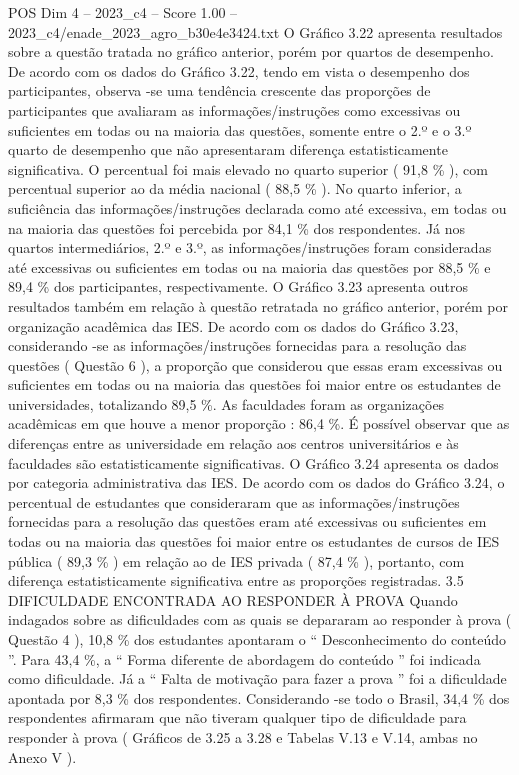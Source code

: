 \begin{textsample}{POS Dim 4 – 2023\_c4 – Score 1.00 – 2023\_c4/enade\_2023\_agro\_b30e4e3424.txt}
O Gráfico 3.22 apresenta resultados sobre a questão tratada no gráfico anterior, porém por quartos de desempenho.
De acordo com os dados do Gráfico 3.22, tendo em vista o desempenho dos participantes, observa -se uma tendência crescente das proporções de participantes que avaliaram as informações/instruções como excessivas ou suficientes em todas ou na maioria das questões, somente entre o 2.º e o 3.º quarto de desempenho que não apresentaram diferença estatisticamente significativa.
O percentual foi mais elevado no quarto superior ( 91,8 \% ), com percentual superior ao da média nacional ( 88,5 \% ).
No quarto inferior, a suficiência das informações/instruções declarada como até excessiva, em todas ou na maioria das questões foi percebida por 84,1 \% dos respondentes.
Já nos quartos intermediários, 2.º e 3.º, as informações/instruções foram consideradas até excessivas ou suficientes em todas ou na maioria das questões por 88,5 \% e 89,4 \% dos participantes, respectivamente.
O Gráfico 3.23 apresenta outros resultados também em relação à questão retratada no gráfico anterior, porém por organização acadêmica das IES.
De acordo com os dados do Gráfico 3.23, considerando -se as informações/instruções fornecidas para a resolução das questões ( Questão 6 ), a proporção que considerou que essas eram excessivas ou suficientes em todas ou na maioria das questões foi maior entre os estudantes de universidades, totalizando 89,5 \%.
As faculdades foram as organizações acadêmicas em que houve a menor proporção : 86,4 \%.
É possível observar que as diferenças entre as universidade em relação aos centros universitários e às faculdades são estatisticamente significativas.
O Gráfico 3.24 apresenta os dados por categoria administrativa das IES.
De acordo com os dados do Gráfico 3.24, o percentual de estudantes que consideraram que as informações/instruções fornecidas para a resolução das questões eram até excessivas ou suficientes em todas ou na maioria das questões foi maior entre os estudantes de cursos de IES pública ( 89,3 \% ) em relação ao de IES privada ( 87,4 \% ), portanto, com diferença estatisticamente significativa entre as proporções registradas. 3.5 DIFICULDADE ENCONTRADA AO RESPONDER À PROVA Quando indagados sobre as dificuldades com as quais se depararam ao responder à prova ( Questão 4 ), 10,8 \% dos estudantes apontaram o “ Desconhecimento do conteúdo ”.
Para 43,4 \%, a “ Forma diferente de abordagem do conteúdo ” foi indicada como dificuldade.
Já a “ Falta de motivação para fazer a prova ” foi a dificuldade apontada por 8,3 \% dos respondentes.
Considerando -se todo o Brasil, 34,4 \% dos respondentes afirmaram que não tiveram qualquer tipo de dificuldade para responder à prova ( Gráficos de 3.25 a 3.28 e Tabelas V.13 e V.14, ambas no Anexo V ).

\end{textsample}
